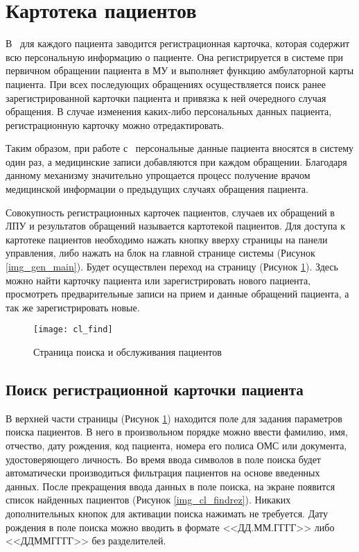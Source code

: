 \newpage
\section{Картотека пациентов}

В \tmis ~для каждого пациента заводится регистрационная карточка, которая содержит всю персональную информацию о пациенте. Она регистрируется в системе при первичном обращении пациента в МУ и выполняет функцию амбулаторной карты пациента. При всех последующих обращениях осуществляется поиск ранее зарегистрированной карточки пациента и привязка к ней очередного случая обращения. В случае изменения каких-либо персональных данных пациента, регистрационную карточку можно отредактировать. 

Таким образом, при работе с \tmis~персональные данные пациента вносятся в систему один раз, а медицинские записи добавляются при каждом обращении. Благодаря данному механизму значительно упрощается процесс получение врачом медицинской информации о предыдущих случаях обращения пациента.

Совокупность регистрационных карточек пациентов, случаев их обращений в ЛПУ и результатов обращений называется картотекой пациентов. Для доступа к картотеке пациентов необходимо нажать кнопку  вверху страницы на панели управления, либо нажать на блок  на главной странице системы (Рисунок \ref{img_gen_main}). Будет осуществлен переход на страницу  (Рисунок \ref{img_cl_find}). Здесь можно найти карточку пациента или зарегистрировать нового пациента, просмотреть предварительные записи на прием и данные обращений пациента, а так же зарегистрировать новые.

\begin{figure}[ht]\centering
 \texttt{[image: cl\_find]}
 \caption{Страница поиска и обслуживания пациентов}
 \label{img_cl_find}
\end{figure} 

\subsection{Поиск регистрационной карточки пациента} \label{cl_find}

В верхней части страницы   (Рисунок \ref{img_cl_find}) находится поле для задания параметров поиска пациентов. В него в произвольном порядке можно ввести фамилию, имя, отчество, дату рождения, код пациента, номера его полиса ОМС или документа, удостоверяющего личность. Во время ввода символов в поле поиска будет автоматически производиться фильтрация пациентов на основе введенных данных. После прекращения ввода данных в поле поиска, на экране появится список найденных пациентов (Рисунок \ref{img_cl_findrez}). Никаких дополнительных кнопок для активации поиска нажимать не требуется. Дату рождения в поле поиска можно вводить в формате <<ДД.ММ.ГГГГ>> либо <<ДДММГГГГ>> без разделителей. 
 

